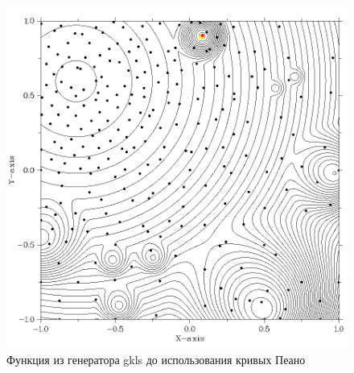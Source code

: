 \documentclass{svproc}
\begin{document}
\begin{figure}[ht!]
	\begin{center}
		\begin{minipage}[h]{0.8\linewidth}
			\includegraphics[width=1\linewidth]{figure/fig2.png}
			\caption{Функция из генератора gkls до использования кривых Пеано} %
			\label{fig:fig2}
		\end{minipage}
	\end{center}
\end{figure}	
\end{document}
